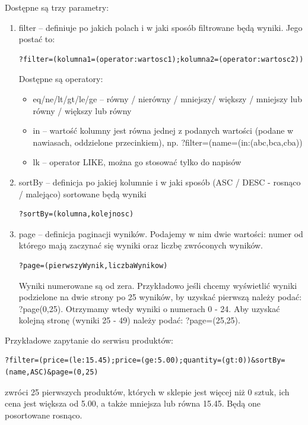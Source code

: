 \documentclass[11pt,a4paper,twoside]{article}
\begin{document}
Dostępne są trzy parametry:
\begin{enumerate}
\item filter -- definiuje po jakich polach i w jaki sposób filtrowane będą wyniki. Jego postać to:
\begin{lstlisting}
?filter=(kolumna1=(operator:wartosc1);kolumna2=(operator:wartosc2))
\end{lstlisting}
\vspace{-20pt}
Dostępne są operatory:
\begin{itemize}
\item eq/ne/lt/gt/le/ge -- równy / nierówny / mniejszy/ większy / mniejszy lub równy / większy lub równy
\item in -- wartość kolumny jest równa jednej z podanych wartości (podane w nawiasach, oddzielone przecinkiem), np. ?filter=(name=(in:(abc,bca,cba))
\item lk -- operator LIKE, można go stosować tylko do napisów
\end{itemize}

\item sortBy -- definicja po jakiej kolumnie i w jaki sposób (ASC / DESC - rosnąco / malejąco) sortowane będą wyniki
\begin{lstlisting}
?sortBy=(kolumna,kolejnosc)
\end{lstlisting}
\vspace{-20pt}

\item page -- definicja paginacji wyników. Podajemy w nim dwie wartości: numer od którego mają zaczynać się wyniki oraz liczbę zwróconych wyników.

\begin{lstlisting}
?page=(pierwszyWynik,liczbaWynikow)
\end{lstlisting}
\vspace{-20pt}

Wyniki numerowane są od zera. Przykładowo jeśli chcemy wyświetlić wyniki podzielone na dwie strony po 25 wyników, by uzyskać pierwszą należy podać: ?page(0,25). Otrzymamy wtedy wyniki o numerach 0 - 24. Aby uzyskać kolejną stronę (wyniki 25 - 49) należy podać: ?page=(25,25).
\end{enumerate}

Przykładowe zapytanie do serwisu produktów:
\begin{lstlisting}
?filter=(price=(le:15.45);price=(ge:5.00);quantity=(gt:0))&sortBy=(name,ASC)&page=(0,25)
\end{lstlisting}
\vspace{-20pt}
zwróci 25 pierwszych produktów, których w sklepie jest więcej niż 0 sztuk, ich cena jest większa od 5.00, a także mniejsza lub równa 15.45. Będą one posortowane rosnąco.
\end{document}
